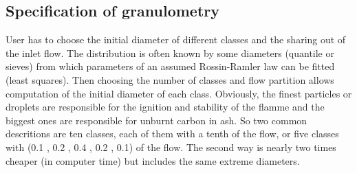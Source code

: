 \subsection{Specification of granulometry}

User has to choose the initial diameter of different classes and the sharing out
of the inlet flow. The distribution is often known by some diameters (quantile
or sieves) from which parameters of an assumed Rossin-Ramler law can be fitted
(least squares). Then choosing the number of classes and flow partition allows
computation of the initial diameter of each class. Obviously, the finest
particles or droplets are responsible for the ignition and stability of the
flamme and the biggest ones are responsible for unburnt carbon in ash. So two
common descritions are ten classes, each of them with a tenth of the flow, or
five classes with (0.1 , 0.2 , 0.4 , 0.2 , 0.1) of the flow. The second way is
nearly two times cheaper (in computer time) but includes the same extreme
diameters.

